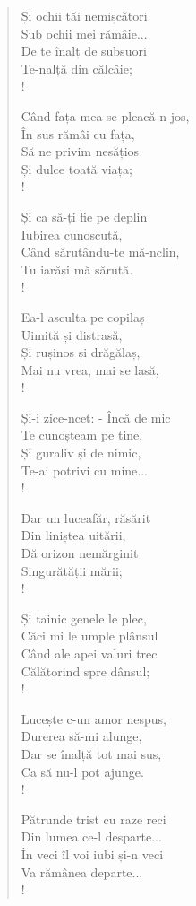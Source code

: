 \documentclass{article}
\begin{document}
\begin{small}
\begin{multicols}{3}
\begin{verse}
Și ochii tăi nemișcători \\
Sub ochii mei rămâie... \\
De te înalț de subsuori \\
Te-nalță din călcâie; \\!

Când fața mea se pleacă-n jos, \\
În sus rămâi cu fața, \\
Să ne privim nesățios \\
Și dulce toată viața; \\!

Și ca să-ți fie pe deplin \\
Iubirea cunoscută, \\
Când sărutându-te mă-nclin, \\
Tu iarăși mă sărută. \\!

Ea-l asculta pe copilaș \\
Uimită și distrasă, \\
Și rușinos și drăgălaș, \\
Mai nu vrea, mai se lasă, \\!

Și-i zice-ncet: - Încă de mic \\
Te cunoșteam pe tine, \\
Și guraliv și de nimic, \\
Te-ai potrivi cu mine... \\!

Dar un luceafăr, răsărit \\
Din liniștea uitării, \\
Dă orizon nemărginit \\
Singurătății mării; \\!

Și tainic genele le plec, \\
Căci mi le umple plânsul \\
Când ale apei valuri trec \\
Călătorind spre dânsul; \\!

Lucește c-un amor nespus, \\
Durerea să-mi alunge, \\
Dar se înalță tot mai sus, \\
Ca să nu-l pot ajunge. \\!

Pătrunde trist cu raze reci \\
Din lumea ce-l desparte... \\
În veci îl voi iubi și-n veci \\
Va rămânea departe... \\!


\end{verse}
\end{multicols}
\end{small}
\end{document}
